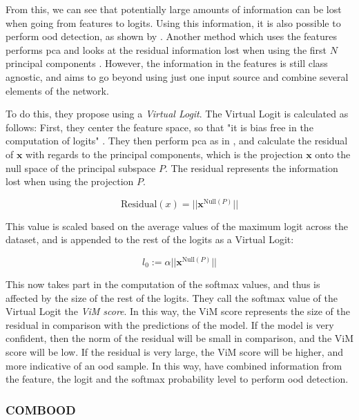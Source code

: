 \documentclass[UKenglish]{uiomasterthesis} %
\theoremstyle{definition}
\begin{document}
From this, we can see that potentially large amounts of information can be lost when going from features to logits. Using this information, it is also possible to perform \ac{ood} detection, as shown by \cite{nusa}. Another method which uses the features performs \ac{pca} and looks at the residual information lost when using the first $N$ principal components \cite{subspace}. However, the information in the features is still class agnostic, and \cite{vim} aims to go beyond using just one input source and combine several elements of the network.

To do this, they propose using a {\it Virtual Logit}. The Virtual Logit is calculated as follows: First, they center the feature space, so that "it is bias free in the computation of logits" \cite{vim}. They then perform \ac{pca} as in \cite{subspace}, and calculate the residual of $\bm{x}$ with regards to the principal components, which is the projection $\bm{x}$ onto the null space of the principal subspace $P$. The residual represents the information lost when using the projection $P$.

\begin{equation}
\text{Residual}(x) = || \bm{x}^{\text{Null}(P)}||
\label{virtuallogit}
\end{equation}

This value is scaled based on the average values of the maximum logit across the dataset, and is appended to the rest of the logits as a Virtual Logit:

\begin{equation}
l_0 := \alpha || \bm{x}^{\text{Null}(P)}||
\label{virtuallogit}
\end{equation}

This now takes part in the computation of the softmax values, and thus is affected by the size of the rest of the logits. They call the softmax value of the Virtual Logit the {\it ViM score}. In this way, the ViM score represents the size of the residual in comparison with the predictions of the model. If the model is very confident, then the norm of the residual will be small in comparison, and the ViM score will be low. If the residual is very large, the ViM score will be higher, and more indicative of an \ac{ood} sample. In this way, \cite{vim} have combined information from the feature, the logit and the softmax probability level to perform \ac{ood} detection.

\subsubsection{COMBOOD}
\end{document}
